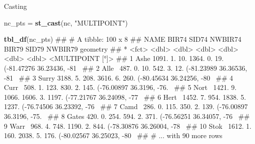 \documentclass[11pt,ignorenonframetext,]{beamer}
\newenvironment{Shaded}{}{}
\newcommand{\KeywordTok}[1]{\textcolor[rgb]{0.00,0.44,0.13}{\textbf{#1}}}
\newcommand{\NormalTok}[1]{#1}
\newcommand{\StringTok}[1]{\textcolor[rgb]{0.25,0.44,0.63}{#1}}
\let\oldShaded\Shaded
\let\endoldShaded\endShaded
\renewenvironment{Shaded}{\footnotesize\begin{spacing}{0.9}\oldShaded}{\endoldShaded\end{spacing}}
\let\oldverbatim\verbatim
\let\endoldverbatim\endverbatim
\newcommand{\scriptoutput}{
  \renewenvironment{Shaded}{\scriptsize\begin{spacing}{0.9}\oldShaded}{\endoldShaded\end{spacing}}
  \renewenvironment{verbatim}{\scriptsize\begin{spacing}{0.9}\oldverbatim}{\endoldverbatim\end{spacing}}
}
\begin{document}
\begin{frame}[fragile,t]{Casting}
\protect\hypertarget{casting}{}

\scriptoutput

\begin{Shaded}
\begin{Highlighting}[]
\NormalTok{nc_pts =}\StringTok{ }\KeywordTok{st_cast}\NormalTok{(nc, }\StringTok{"MULTIPOINT"}\NormalTok{)}

\KeywordTok{tbl_df}\NormalTok{(nc_pts)}
\NormalTok{## # A tibble: 100 x 8}
\NormalTok{##    NAME  BIR74 SID74 NWBIR74 BIR79 SID79 NWBIR79                  geometry}
\NormalTok{##  * <fct> <dbl> <dbl>   <dbl> <dbl> <dbl>   <dbl>          <MULTIPOINT [°]>}
\NormalTok{##  1 Ashe  1091.    1.     10. 1364.    0.     19. (-81.47276 36.23436, -81~}
\NormalTok{##  2 Alle~  487.    0.     10.  542.    3.     12. (-81.23989 36.36536, -81~}
\NormalTok{##  3 Surry 3188.    5.    208. 3616.    6.    260. (-80.45634 36.24256, -80~}
\NormalTok{##  4 Curr~  508.    1.    123.  830.    2.    145. (-76.00897 36.3196, -76.~}
\NormalTok{##  5 Nort~ 1421.    9.   1066. 1606.    3.   1197. (-77.21767 36.24098, -77~}
\NormalTok{##  6 Hert~ 1452.    7.    954. 1838.    5.   1237. (-76.74506 36.23392, -76~}
\NormalTok{##  7 Camd~  286.    0.    115.  350.    2.    139. (-76.00897 36.3196, -75.~}
\NormalTok{##  8 Gates  420.    0.    254.  594.    2.    371. (-76.56251 36.34057, -76~}
\NormalTok{##  9 Warr~  968.    4.    748. 1190.    2.    844. (-78.30876 36.26004, -78~}
\NormalTok{## 10 Stok~ 1612.    1.    160. 2038.    5.    176. (-80.02567 36.25023, -80~}
\NormalTok{## # ... with 90 more rows}
\end{Highlighting}
\end{Shaded}

\end{frame}
\end{document}
